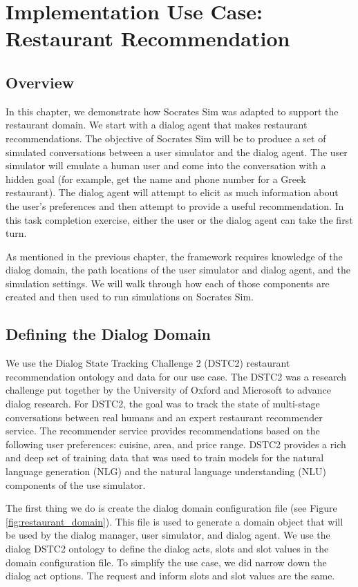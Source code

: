 \chapter{Implementation Use Case:  Restaurant Recommendation }
\label{chap:restaurant}
\section{Overview}

In this chapter, we demonstrate how Socrates Sim was adapted to support the restaurant domain. We start with a dialog agent that makes restaurant recommendations. The objective of Socrates Sim will be to produce a set of simulated conversations between a user simulator and the dialog agent. The user simulator will emulate a human user and come into the conversation with a hidden goal (for example, get the name and phone number for a Greek restaurant). The dialog agent will attempt to elicit as much information about the user's preferences and then attempt to provide a useful recommendation.  In this task completion exercise, either the user or the dialog agent can take the first turn. 

As mentioned in the previous chapter, the framework requires knowledge of the dialog domain, the path locations of the user simulator and dialog agent, and the simulation settings. We will walk through how each of those components are created and then used to run simulations on Socrates Sim.

\section{Defining the Dialog Domain}

We use the Dialog State Tracking Challenge 2 (DSTC2) restaurant recommendation ontology and data for our use case. The DSTC2 was a research challenge put together by the University of Oxford and Microsoft to advance dialog research. For DSTC2, the goal was to track the state of multi-stage conversations between real humans and an expert restaurant recommender service. The recommender service provides recommendations based on the following user preferences: cuisine, area, and price range. DSTC2 provides a rich and deep set of training data that was used to train models for the natural language generation (NLG) and the natural language understanding (NLU) components of the use simulator.

The first thing we do is create the dialog domain configuration file (see Figure \ref{fig:restaurant_domain}). This file is used to generate a domain object that will be used by the dialog manager, user simulator, and dialog agent. We use the dialog DSTC2 ontology to define the dialog acts, slots and slot values in the domain configuration file. To simplify the use case, we did narrow down the dialog act options. The request and inform slots and slot values are the same. 


